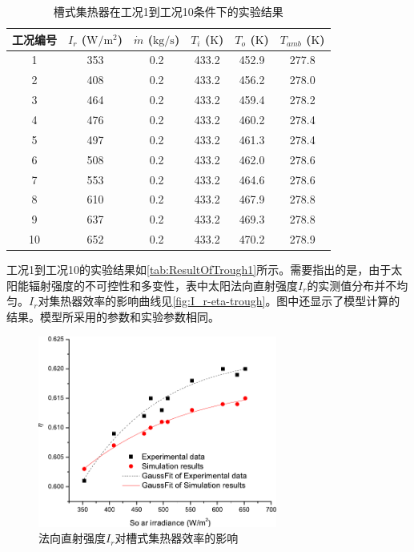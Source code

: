 \begin{table}[htbp]
\setlength{\abovecaptionskip}{0pt}
	\caption{槽式集热器在工况1到工况10条件下的实验结果}
	\centering
	\begin{tabular}{cccccc}
		\toprule
		工况编号	& $I_r$ ($\mathrm{W/m^2}$)	&	$\dot{m}$ ($\mathrm{kg/s}$)			&	$T_i$ ($\mathrm{K}$)	&	$T_o$ ($\mathrm{K}$)		&	$T_{amb}$ ($\mathrm{K}$)\\
		\midrule
		1	&	353	&	0.2	&	433.2	&	452.9	&	277.8\\
		2	&	408	&	0.2	&	433.2	&	456.2	&	278.0\\
		3	&	464	&	0.2	&	433.2	&	459.4	&	278.2\\
		4	&	476	&	0.2	&	433.2	&	460.2	&	278.4\\
		5	&	497	&	0.2	&	433.2	&	461.3	&	278.4\\
		6	&	508	&	0.2	&	433.2	&	462.0	&	278.6\\
		7	&	553	&	0.2	&	433.2	&	464.6	&	278.6\\
		8	&	610	&	0.2	&	433.2	&	467.9	&	278.8\\
		9	&	637	&	0.2	&	433.2	&	469.3	&	278.8\\
		10	&	652	&	0.2	&	433.2	&	470.2	&	278.9\\
		\bottomrule
	\end{tabular}
	\label{tab:ResultOfTrough1}
\end{table}
工况1到工况10的实验结果如\autoref{tab:ResultOfTrough1}所示。需要指出的是，由于太阳能辐射强度的不可控性和多变性，表中太阳法向直射强度$I_r$的实测值分布并不均匀。$I_r$对集热器效率的影响曲线见\autoref{fig:I_r-eta-trough}。图中还显示了模型计算的结果。模型所采用的参数和实验参数相同。
\begin{figure}[!ht]
\centering
\includegraphics[width=0.7\textwidth]{fig/I_r-eta-trough}
\caption{法向直射强度$I_r$对槽式集热器效率的影响}
\label{fig:I_r-eta-trough}
\end{figure}

